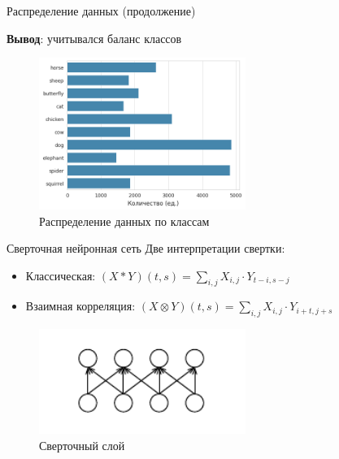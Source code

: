 \documentclass[12pt]{beamer}
\begin{document}
\begin{frame}{Распределение данных (продолжение)}
    \begin{center}
        \textbf{Вывод}: учитывался баланс классов
    \end{center}
    \begin{figure}[h]
        \centering
        \includegraphics[width=0.6\textwidth]{images/class_dist.png}
        \caption{Распределение данных по классам}
        \label{fig:class_dist}
    \end{figure}
\end{frame}

\begin{frame}{Сверточная нейронная сеть}
    Две интерпретации свертки:
    \begin{itemize}
        \item Классическая: $(X * Y)(t, s) = \sum_{i, j} X_{i,j} \cdot Y_{t - i, s - j}$
        \item Взаимная корреляция: $(X \otimes Y)(t, s) = \sum_{i, j} X_{i, j} \cdot Y_{i + t, j + s}$
    \end{itemize}

    \begin{figure}[h]
        \centering
        \includegraphics[width=0.6\textwidth]{images/conv.pdf}
        \caption{Сверточный слой}
        \label{fig:conv_layer}
    \end{figure}
\end{frame}
\end{document}
